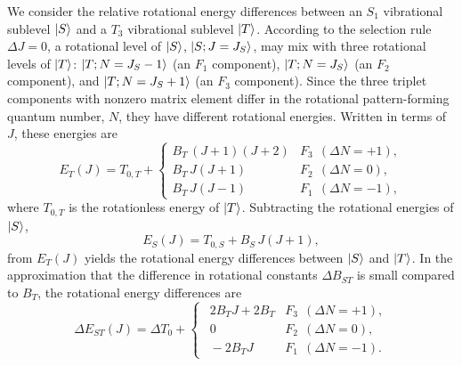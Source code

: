 \documentclass[12pt]{mitthesis}
\begin{document}
We consider the relative rotational energy differences between an
$S_1$ vibrational sublevel $\mathinner{|{S}\rangle}$ and a $T_3$ vibrational sublevel
$\mathinner{|{T}\rangle}$.  According to the selection rule $\Delta J = 0$, a
rotational level of $\mathinner{|{S}\rangle}$, $\mathinner{|{S;J=J_S}\rangle}$, may mix with three
rotational levels of $\mathinner{|{T}\rangle}$: $\mathinner{|{T;N=J_S-1}\rangle}$ (an $F_1$
component), $\mathinner{|{T;N=J_S}\rangle}$ (an $F_2$ component), and
$\mathinner{|{T;N=J_S+1}\rangle}$ (an $F_3$ component).  Since the three triplet
components with nonzero matrix element differ in the rotational
pattern-forming quantum number, $N$, they have different rotational
energies.  Written in terms of $J$, these energies are
\begin{equation}
  E_T(J) = T_{0,T} + 
  \begin{cases}
    B_T \, (J+1)(J+2) & F_3 \:\: (\Delta N = +1), \\
    B_T \, J(J+1)     & F_2 \:\: (\Delta N = 0), \\
    B_T \, J(J-1)     & F_1 \:\: (\Delta N = -1),
  \end{cases}
\end{equation}
where $T_{0,T}$ is the rotationless energy of $\mathinner{|{T}\rangle}$.  Subtracting
the rotational energies of $\mathinner{|{S}\rangle}$,
\begin{equation}
  E_S(J) = T_{0,S} + B_S \, J(J+1),
\end{equation}
from $E_T(J)$ yields the rotational energy differences between
$\mathinner{|{S}\rangle}$ and $\mathinner{|{T}\rangle}$.  In the approximation that the difference in
rotational constants $\Delta B_{ST}$ is small compared to $B_T$, the
rotational energy differences are
\begin{equation}
  \label{eq:components}
  \Delta E_{ST}(J) = \Delta T_0 +
  \begin{cases}
    \:\: 2B_TJ + 2 B_T 
    & F_3 \:\: (\Delta N = +1), \\
    \:\: 0
    & F_2 \:\: (\Delta N = 0), \\
    \:\: - 2B_TJ
    & F_1 \:\: (\Delta N = -1).
  \end{cases}
\end{equation}
\end{document}

